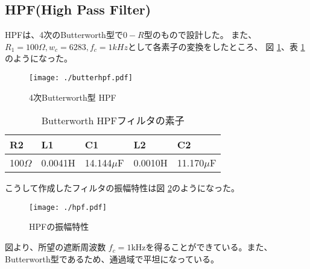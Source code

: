 \documentclass[a4j,twocolumn]{jsarticle}
\begin{document}
\subsection{HPF(High Pass Filter)}
HPFは、4次のButterworth型で$0-R型$のもので設計した。
また、$R_{1} = 100\Omega, w_{c} = 6283, f_{c} = 1kHz$として各素子の変換をしたところ、
図 \ref{hpf}、表 \ref{hpfhyou}のようになった。
\begin{figure}[H]
    \centering
   \texttt{[image: ./butterhpf.pdf]}
   \caption{4次Butterworth型 HPF}
    \label{hpf}
\end{figure}
\begin{table}
    \centering
    \caption{Butterworth HPFフィルタの素子}
    \begin{tabular}{@{}lllll@{}} \toprule
    R2 & L1 & C1 & L2 & C2\\ \midrule
    100$\Omega$ & 0.0041H & 14.144$\mu$F & 0.0010H & 11.170$\mu$F \\ \bottomrule
    \end{tabular} 
    \label{hpfhyou}
\end{table}
こうして作成したフィルタの振幅特性は図 \ref{hpfs}のようになった。
\begin{figure}[H]
    \centering
   \texttt{[image: ./hpf.pdf]}
   \caption{HPFの振幅特性}
    \label{hpfs}
\end{figure}
図より、所望の遮断周波数 $f_{c} = 1$kHzを得ることができている。また、Butterworth型であるため、通過域で平坦になっている。
\end{document}
